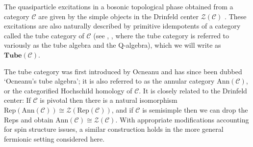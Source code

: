 \documentclass[12pt,a4paper]{article}
\newcommand{\mcz}{\mathcal{Z}}
\newcommand{\mcc}{\mathcal{C}}
\newcommand{\tube}{\textbf{Tube}}
\newcommand{\kw}[1]{{\color{kwcolor}\footnotesize{(KW) #1}}}
\newcommand{\ethan}[1]{{\color{amethyst}\footnotesize{(EL) #1}}}
\begin{document}
The quasiparticle excitations in a bosonic topological phase obtained from a category $\mcc$ 
are given by the simple objects in the Drinfeld center $\mcz(\mcc)$ \cite{levin2005}.
These excitations are also naturally described by primitive idempotents of a category called the tube category of $\mcc$ (see \cite{ocneanu2001,evans1995,Izumi2000,muger2003b,Bultinck2017}, \cite{Lan2014, Hu2015}, 
where the tube category is referred to variously as the tube algebra and the Q-algebra), 
which we will write as $\tube(\mcc)$.

The tube category was first introduced by Ocneanu \cite{ocneanu1994} and has since 
been dubbed `Ocneanu's tube algebra'; it is also referred to as the annular category $\text{Ann}(\mcc)$, 
or the categorified Hochschild homology of $\mcc$.
It is closely related to the Drinfeld center:
If $\mcc$ is pivotal then there is a natural isomorphism
$\text{Rep}(\text{Ann}(\mcc)) \cong \mcz(\text{Rep}(\mcc))$, and if $\mcc$ is semisimple then we can drop
the $\text{Rep}$s and obtain $\text{Ann}(\mcc) \cong \mcz(\mcc)$.
With appropriate modifications accounting for spin structure issues, a similar construction holds 
in the more general fermionic setting considered here. 


\end{document}
